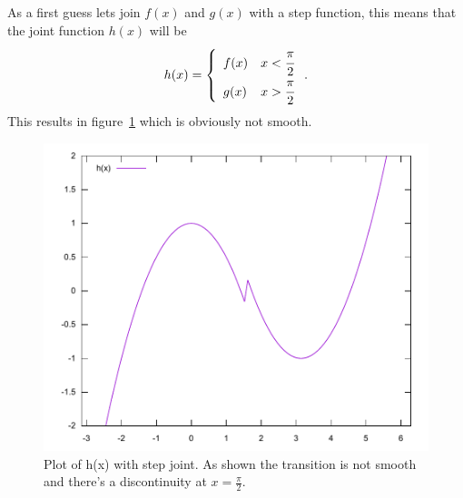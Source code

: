 \documentclass[11pt,DIV=10,final]{scrreprt} %
\begin{document}
As a first guess lets join $f(x)$ and $g(x)$ with a step function, this means that the joint function $h(x)$ will be
\[
  h(x) =  \left\{
    \begin{array}{ll}
           f(x) & x < \cfrac{\pi}{2} \\
           g(x) & x > \cfrac{\pi}{2}
    \end{array}
    \right..
\]
This results in figure~\ref{fig:joint-step} which is obviously not smooth.
\begin{figure}[H]
  \centering
  \includegraphics[width=.9\textwidth]{plots/step_joint.pdf}
  \caption{Plot of h(x) with step joint. As shown the transition is not smooth and there's a discontinuity at $x = \frac{\pi}{2}$.}\label{fig:joint-step}
\end{figure}
\end{document}
